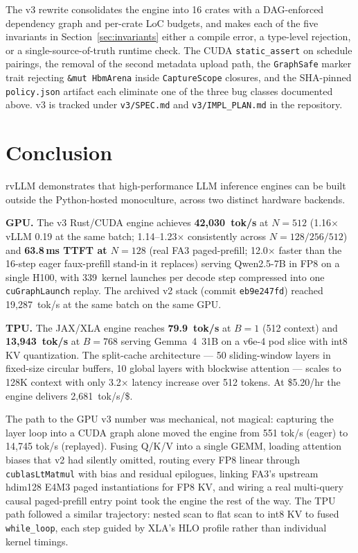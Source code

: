 The v3 rewrite consolidates the engine into 16 crates with a
DAG-enforced dependency graph and per-crate LoC budgets, and makes
each of the five invariants in Section~\ref{sec:invariants} either a
compile error, a type-level rejection, or a single-source-of-truth
runtime check. The CUDA \texttt{static\_assert} on schedule pairings,
the removal of the second metadata upload path, the
\texttt{GraphSafe} marker trait rejecting
\texttt{\&mut HbmArena} inside \texttt{CaptureScope} closures, and the
SHA-pinned \texttt{policy.json} artifact each eliminate one of the
three bug classes documented above. v3 is tracked under
\texttt{v3/SPEC.md} and \texttt{v3/IMPL\_PLAN.md} in the repository.

\section{Conclusion}
\label{sec:conclusion}

rvLLM demonstrates that high-performance LLM inference engines can be
built outside the Python-hosted monoculture, across two distinct hardware
backends.

\textbf{GPU.} The v3 Rust/CUDA engine achieves
\textbf{42{,}030~tok/s} at $N\!=\!512$ (1.16$\times$ vLLM 0.19 at the
same batch; 1.14--1.23$\times$ consistently across
$N\!=\!128/256/512$) and \textbf{63.8\,ms TTFT at $N\!=\!128$} (real
FA3 paged-prefill; 12.0$\times$ faster than the 16-step eager
faux-prefill stand-in it replaces) serving Qwen2.5-7B in FP8 on a
single H100, with 339~kernel launches per decode step compressed into
one \texttt{cuGraphLaunch} replay. The archived v2 stack (commit
\texttt{eb9e247fd}) reached 19{,}287~tok/s at the same batch on the
same GPU.

\textbf{TPU.} The JAX/XLA engine reaches \textbf{79.9~tok/s} at
$B\!=\!1$ (512 context) and \textbf{13{,}943~tok/s} at $B\!=\!768$
serving Gemma~4~31B on a v6e-4 pod slice with int8 KV quantization.
The split-cache architecture --- 50 sliding-window layers in fixed-size
circular buffers, 10 global layers with blockwise attention --- scales
to 128K context with only 3.2$\times$ latency increase over 512 tokens.
At \$5.20/hr the engine delivers 2{,}681~tok/s/\$.

The path to the GPU v3 number was mechanical, not magical: capturing the
layer loop into a CUDA graph alone moved the engine from 551 tok/s
(eager) to 14{,}745 tok/s (replayed). Fusing Q/K/V into a single GEMM,
loading attention biases that v2 had silently omitted, routing every FP8
linear through \texttt{cublasLtMatmul} with bias and residual epilogues,
linking FA3's upstream hdim128 E4M3 paged instantiations for FP8 KV,
and wiring a real multi-query causal paged-prefill entry point took
the engine the rest of the way. The TPU path followed a similar
trajectory: nested scan to flat scan to int8 KV to fused
\texttt{while\_loop}, each step guided by XLA's HLO profile rather
than individual kernel timings.

